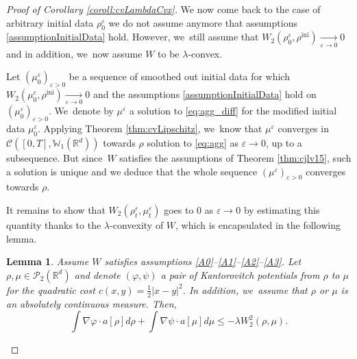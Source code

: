 \documentclass[JEP,XML,SOM,Unicode, NoFloatCountersInSection,published]{cedram}
\newcommand{\ini}{\mathrm{ini}}
\def\RR{\mathbb{R}}
\def\WW{\mathbb{W}}
\newcommand{\limi}[2]{\underset{#1 \to #2}{\longrightarrow}}
\def\eps{\varepsilon}
\def\calC{{\mathcal C}}
\def\calP{{\mathcal P}}
\theoremstyle{plain}
\newtheorem{lemma}[theorem]{Lemma}
\theoremstyle{definition}
\begin{document}
\begin{proof}[Proof of Corollary \ref{coroll:cvLambdaCvx}]
We now come back to the case of arbitrary initial data $\rho_0^\eps$ \ie we do not assume anymore that assumptions \eqref{assumptionInitialData} hold. However, we~still assume that $W_2(\rho_0^\eps, \rho^{\ini}) \limi{\eps}{0} 0$ and in addition, we~now assume $W$ to be $\lambda$-convex.

Let $(\mu^\eps_0)_{\eps > 0}$ be a sequence of smoothed out initial data for which $W_2(\mu_0^\eps,\rho^{\ini}) \limi{\eps}{0} 0$ and the assumptions \eqref{assumptionInitialData} hold on $(\mu^\eps_0)_{\eps > 0}$. We~denote by $\mu^\eps$ a solution to \eqref{eq:agg_diff} for the modified initial data $\mu^\eps_0$. Applying Theorem \ref{thm:cvLipschitz}, we~know that $\mu^\eps$ converges in $\calC([0,T], \WW_1(\RR^d))$ towards $\rho$ solution to \eqref{eq:agg} as $\eps \to 0$, up to a subsequence. But since~$W$ satisfies the assumptions of Theorem \ref{thm:cjlv15}, such a solution is unique and we deduce that the whole sequence $(\mu^\eps)_{\eps>0}$ converges towards $\rho$.

It remains to show that $W_2(\rho^\eps_t, \mu^\eps_t)$ goes to 0 as $\eps \to 0$ by estimating this quantity thanks to the $\lambda$-convexity of $W$, which is encapsulated in the following lemma.
\begin{lemma}\label{lemma:contractionLambdaCvx}
Assume $W$ satisfies assumptions \eqref{A0}--\eqref{A1}--\eqref{A2}--\eqref{A3}. Let $\rho, \mu \in \calP_2(\RR^d)$ and denote $(\varphi, \psi)$ a pair of Kantorovitch potentials from $\rho$ to $\mu$ for the quadratic cost $c(x,y) = \frac 12 |x-y|^2$. In addition, we~assume that $\rho$ or $\mu$ is an absolutely continuous measure. Then,
\begin{equation*}%
\int \nabla \varphi \cdot a[\rho] d\rho + \int \nabla \psi \cdot a[\mu] d\mu \leq -\lambda W_2^2(\rho, \mu).
\end{equation*}
\end{lemma}


\end{proof}
\end{document}
